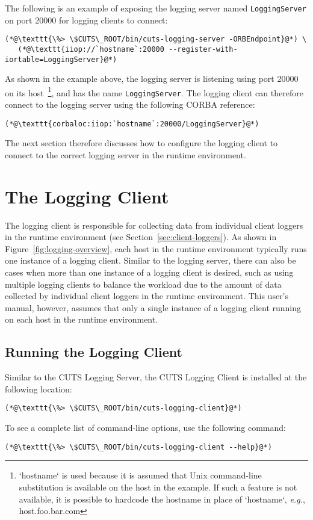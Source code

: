 The following is an example of exposing the logging server named
\texttt{LoggingServer} on port 20000 for logging clients to connect:
\begin{lstlisting}
(*@\texttt{\%> \$CUTS\_ROOT/bin/cuts-logging-server -ORBEndpoint}@*) \
   (*@\texttt{iiop://`hostname`:20000 --register-with-iortable=LoggingServer}@*)
\end{lstlisting}
As shown in the example above, the logging server is listening using
port 20000 on its host~\footnote{`hostname` is used because it is assumed
that Unix command-line substitution is available on the host in the 
example. If such a feature is not available, it is possible to hardcode 
the hostname in place of `hostname`, \textit{e.g.}, host.foo.bar.com}, 
and has the name \texttt{LoggingServer}. The logging client can 
therefore connect to the logging server using the following CORBA 
reference: 
\begin{lstlisting}
(*@\texttt{corbaloc:iiop:`hostname`:20000/LoggingServer}@*)
\end{lstlisting}
The next section therefore discusses how to configure the logging 
client to connect to the correct logging server in the runtime 
environment.

\section{The Logging Client}
\label{sec:logging-client}

The logging client is responsible for collecting data from individual
client loggers in the runtime environment (see Section~\ref{sec:client-loggers}).
As shown in Figure~\ref{fig:logging-overview}, each host in the 
runtime environment typically runs one instance of a logging client. 
Similar to the logging server, there can also be cases when more than 
one instance of a logging client is desired, such as using multiple 
logging clients to balance the workload due to the amount of data 
collected by individual client loggers in the runtime environment. This 
user's manual, however, assumes that only a single instance of a logging 
client running on each host in the runtime environment.

\subsection{Running the Logging Client}

Similar to the CUTS Logging Server, the CUTS Logging Client is installed
at the following location:
\begin{lstlisting}
(*@\texttt{\%> \$CUTS\_ROOT/bin/cuts-logging-client}@*)
\end{lstlisting}
To see a complete list of command-line options, use the following
command:
\begin{lstlisting}
(*@\texttt{\%> \$CUTS\_ROOT/bin/cuts-logging-client --help}@*)
\end{lstlisting}

